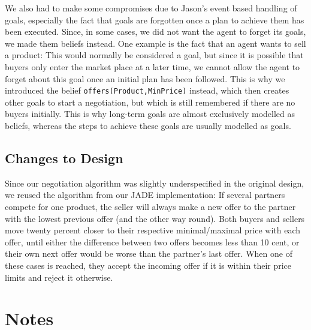 \documentclass[a4paper,11pt]{article}
\begin{document}
We also had to make some compromises due to Jason's event based handling of goals, especially the fact that goals are forgotten once a plan to achieve them has been executed. Since, in some cases, we did not want the agent to forget its goals, we made them beliefs instead. One example is the fact that an agent wants to sell a product: This would normally be considered a goal, but since it is possible that buyers only enter the market place at a later time, we cannot allow the agent to forget about this goal once an initial plan has been followed. This is why we introduced the belief \texttt{offers(Product,MinPrice)} instead, which then creates other goals to start a negotiation, but which is still remembered if there are no buyers initially. This is why long-term goals are almost exclusively modelled as beliefs, whereas the steps to achieve these goals are usually modelled as goals.


\subsection{Changes to Design}
Since our negotiation algorithm was slightly underspecified in the original design, we reused the algorithm from our JADE implementation: If several partners compete for one product, the seller will always make a new offer to the partner with the lowest previous offer (and the other way round). Both buyers and sellers move twenty percent closer to their respective minimal/maximal price with each offer, until either the difference between two offers becomes less than 10 cent, or their own next offer would be worse than the partner's last offer. When one of these cases is reached, they accept the incoming offer if it is within their price limits and reject it otherwise.

\section{Notes}
\end{document}
